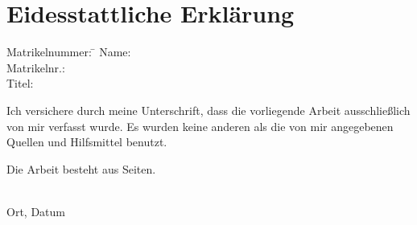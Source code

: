 \section*{Eidesstattliche Erklärung}

\begin{tabbing}
	Matrikelnummer: \= \kill
	Name: \> \thesisAuthor\\
	Matrikelnr.: \> \Matrikelnummer\\
	Titel: \> \thesisTitle\\
\end{tabbing}

Ich versichere durch meine Unterschrift, dass die vorliegende Arbeit ausschließlich von mir verfasst wurde.
Es wurden keine anderen als die von mir angegebenen Quellen und Hilfsmittel benutzt.

Die Arbeit besteht aus \underline{\hspace{3em}} Seiten.

\vspace{8ex}
\begin{tabbing}
\underline{\hspace{14em}} \hspace{3em}\= \underline{\hspace{14em}} \\
Ort, Datum \> \thesisAuthor
\end{tabbing}



